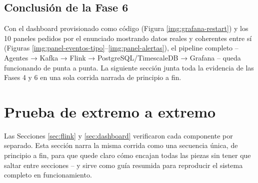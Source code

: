 
\subsection{Conclusión de la Fase 6}

Con el dashboard provisionado como código (Figura \ref{img:grafana-restart}) y los 10 paneles pedidos por el enunciado mostrando datos reales y coherentes entre sí (Figuras \ref{img:panel-eventos-tipo}--\ref{img:panel-alertas}), el pipeline completo -- Agentes → Kafka → Flink → PostgreSQL/TimescaleDB → Grafana -- queda funcionando de punta a punta. La siguiente sección junta toda la evidencia de las Fases 4 y 6 en una sola corrida narrada de principio a fin.

\clearpage
\section{Prueba de extremo a extremo}
\label{sec:extremo-a-extremo}

Las Secciones \ref{sec:flink} y \ref{sec:dashboard} verificaron cada componente por separado. Esta sección narra la misma corrida como una secuencia única, de principio a fin, para que quede claro cómo encajan todas las piezas sin tener que saltar entre secciones -- y sirve como guía resumida para reproducir el sistema completo en funcionamiento.

